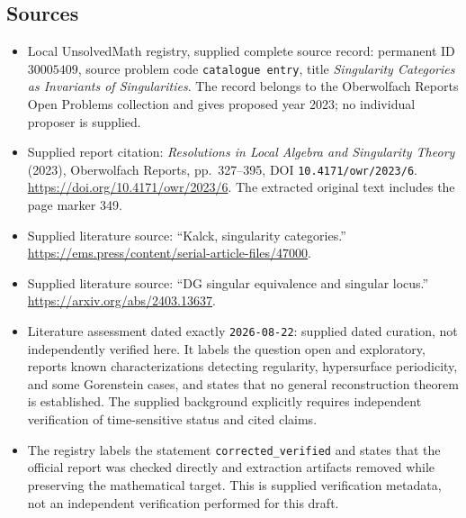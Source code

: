 \documentclass[11pt]{article}
\begin{document}
\subsection{Sources}
\begin{itemize}
\item Local UnsolvedMath registry, supplied complete source record: permanent ID \(30005409\), source problem code \texttt{catalogue entry}, title \emph{Singularity Categories as Invariants of Singularities}. The record belongs to the Oberwolfach Reports Open Problems collection and gives proposed year 2023; no individual proposer is supplied.
\item Supplied report citation: \emph{Resolutions in Local Algebra and Singularity Theory} (2023), Oberwolfach Reports, pp.\ 327--395, DOI \texttt{10.4171/owr/2023/6}. \url{https://doi.org/10.4171/owr/2023/6}. The extracted original text includes the page marker 349.
\item Supplied literature source: ``Kalck, singularity categories.'' \url{https://ems.press/content/serial-article-files/47000}.
\item Supplied literature source: ``DG singular equivalence and singular locus.'' \url{https://arxiv.org/abs/2403.13637}.
\item Literature assessment dated exactly \texttt{2026-08-22}: supplied dated curation, not independently verified here. It labels the question open and exploratory, reports known characterizations detecting regularity, hypersurface periodicity, and some Gorenstein cases, and states that no general reconstruction theorem is established. The supplied background explicitly requires independent verification of time-sensitive status and cited claims.
\item The registry labels the statement \texttt{corrected\_verified} and states that the official report was checked directly and extraction artifacts removed while preserving the mathematical target. This is supplied verification metadata, not an independent verification performed for this draft.
\end{itemize}
\end{document}
